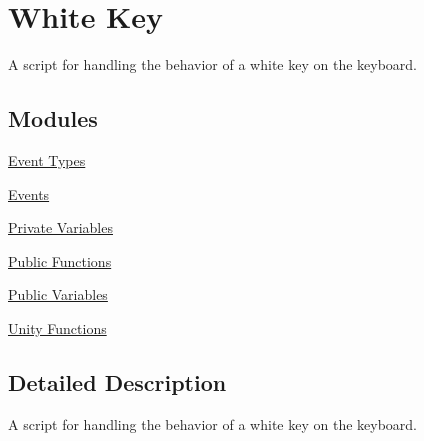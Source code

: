 \hypertarget{group___doc_white_key}{}\section{White Key}
\label{group___doc_white_key}


A script for handling the behavior of a white key on the keyboard.  


\subsection*{Modules}
\begin{DoxyCompactItemize}
\item 
\hyperlink{group___white_key_event_types}{Event Types}
\item 
\hyperlink{group___white_key_events}{Events}
\item 
\hyperlink{group___white_key_priv_var}{Private Variables}
\item 
\hyperlink{group___white_key_pub_func}{Public Functions}
\item 
\hyperlink{group___white_key_pub_var}{Public Variables}
\item 
\hyperlink{group___white_key_unity}{Unity Functions}
\end{DoxyCompactItemize}


\subsection{Detailed Description}
A script for handling the behavior of a white key on the keyboard. 

